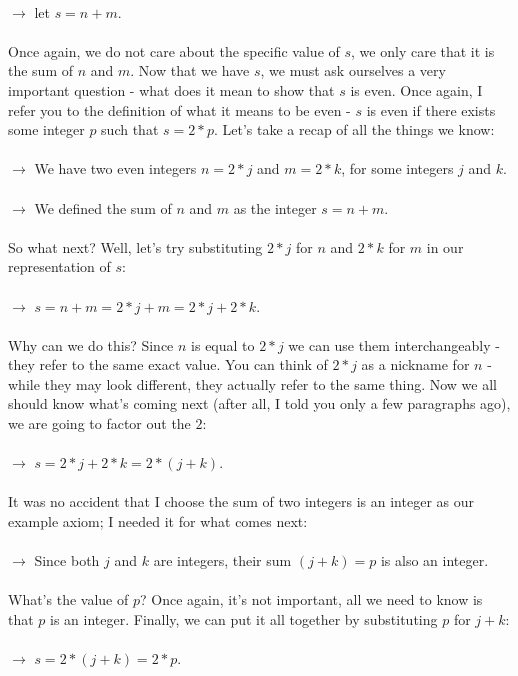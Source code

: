 \documentclass[a4paper,12pt]{article}
\begin{document}
\\
$\rightarrow$ let $s = n + m$.\\
\\
Once again, we do not care about the specific value of $s$, we only care that it is the sum of $n$ and $m$. Now that we have $s$, we must ask ourselves a very important question - what does it mean to show that $s$ is even. Once again, I refer you to the definition of what it means to be even - $s$ is even if there exists some integer $p$ such that $s = 2*p$. Let's take a recap of all the things we know:\\
\\
$\rightarrow$ We have two even integers $n = 2*j$ and $m = 2*k$, for some integers $j$ and $k$.\\
\\
$\rightarrow$ We defined the sum of $n$ and $m$ as the integer $s = n + m$. \\
\\
So what next? Well, let's try substituting $2*j$ for $n$ and $2*k$ for $m$ in our representation of $s$: \\
\\
$\rightarrow$ $s = n + m = 2*j + m = 2*j + 2*k$.\\
\\
Why can we do this? Since $n$ is equal to $2*j$ we can use them interchangeably - they refer to the same exact value. You can think of $2*j$ as a nickname for $n$ - while they may look different, they actually refer to the same thing. Now we all should know what's coming next (after all, I told you only a few paragraphs ago), we are going to factor out the $2$:\\
\\
$\rightarrow$ $s = 2*j + 2*k = 2*(j + k)$. \\
\\
It was no accident that I choose the sum of two integers is an integer as our example axiom; I needed it for what comes next:\\
\\
$\rightarrow$ Since both $j$ and $k$ are integers, their sum $(j + k) = p$ is also an integer.\\
\\
What's the value of $p$? Once again, it's not important, all we need to know is that $p$ is an integer. Finally, we can put it all together by substituting $p$ for $j + k$:\\
\\
$\rightarrow$ $s = 2*(j + k) = 2*p$.\\ 
\end{document}
